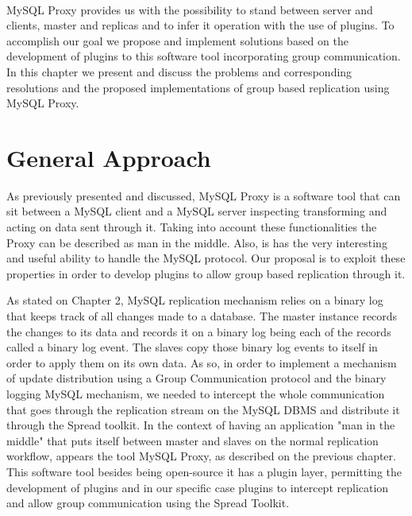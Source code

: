 \paragraph{}


MySQL Proxy provides us with the possibility to stand between server and clients, master and replicas and to infer it operation with the use of plugins. To accomplish our goal we propose and implement solutions based on the development of plugins to this software tool incorporating group communication. In this chapter we present and discuss the problems and corresponding resolutions and the proposed implementations of group based replication using MySQL Proxy.   

\section{General Approach}

As previously presented and discussed, MySQL Proxy is a software tool that can sit between a MySQL client and a MySQL server inspecting transforming and acting on data sent through it. Taking into account these functionalities the Proxy can be described as man in the middle. Also, is has the very interesting and useful ability to handle the MySQL protocol. Our proposal is to exploit these properties in order to develop plugins to allow group based replication through it.  

As stated on Chapter 2, MySQL replication mechanism relies on a binary log that keeps track of all changes made to a database. The master instance records the changes to its data and records it on a binary log being each of the records called a binary log event. The slaves copy those binary log events to itself in order to apply them on its own data.
As so, in order to implement a mechanism of update distribution using a Group Communication protocol and the binary logging MySQL mechanism, we needed to intercept the whole communication that goes through the replication stream on the MySQL DBMS and distribute it through the Spread toolkit. In the context of having an application "man in the middle" that puts itself between master and slaves on the normal replication workflow, appears the tool MySQL Proxy, as described on the previous chapter. This software tool besides being open-source it has a plugin layer, permitting the development of plugins and in our specific case plugins to intercept replication and allow group communication using the Spread Toolkit.


